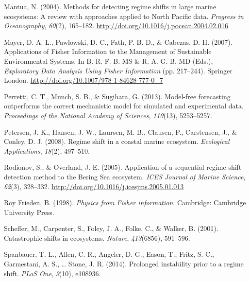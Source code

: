 \documentclass[12pt,twoside]{reedthesis}
\begin{document}
\hypertarget{ref-mantua_methods_2004}{}
Mantua, N. (2004). Methods for detecting regime shifts in large marine
ecosystems: A review with approaches applied to North Pacific data.
\emph{Progress in Oceanography}, \emph{60}(2), 165--182.
\url{http://doi.org/10.1016/j.pocean.2004.02.016}

\hypertarget{ref-mayer_applications_2007}{}
Mayer, D. A. L., Pawlowski, D. C., Fath, P. B. D., \& Cabezas, D. H.
(2007). Applications of Fisher Information to the Management of
Sustainable Environmental Systems. In B. R. F. B. MS \& R. A. G. B. MD
(Eds.), \emph{Exploratory Data Analysis Using Fisher Information} (pp.
217--244). Springer London.
\url{http://doi.org/10.1007/978-1-84628-777-0_7}

\hypertarget{ref-perretti_model-free_2013}{}
Perretti, C. T., Munch, S. B., \& Sugihara, G. (2013). Model-free
forecasting outperforms the correct mechanistic model for simulated and
experimental data. \emph{Proceedings of the National Academy of
Sciences}, \emph{110}(13), 5253--5257.

\hypertarget{ref-petersen2008regime}{}
Petersen, J. K., Hansen, J. W., Laursen, M. B., Clausen, P., Carstensen,
J., \& Conley, D. J. (2008). Regime shift in a coastal marine ecosystem.
\emph{Ecological Applications}, \emph{18}(2), 497--510.

\hypertarget{ref-rodionov_application_2005}{}
Rodionov, S., \& Overland, J. E. (2005). Application of a sequential
regime shift detection method to the Bering Sea ecosystem. \emph{ICES
Journal of Marine Science}, \emph{62}(3), 328--332.
\url{http://doi.org/10.1016/j.icesjms.2005.01.013}

\hypertarget{ref-roy_frieden_physics_1998}{}
Roy Frieden, B. (1998). \emph{Physics from Fisher information}.
Cambridge: Cambridge University Press.

\hypertarget{ref-scheffer_catastrophic_2001}{}
Scheffer, M., Carpenter, S., Foley, J. A., Folke, C., \& Walker, B.
(2001). Catastrophic shifts in ecosystems. \emph{Nature},
\emph{413}(6856), 591--596.

\hypertarget{ref-spanbauer_prolonged_2014}{}
Spanbauer, T. L., Allen, C. R., Angeler, D. G., Eason, T., Fritz, S. C.,
Garmestani, A. S., \ldots{} Stone, J. R. (2014). Prolonged instability
prior to a regime shift. \emph{PLoS One}, \emph{9}(10), e108936.


\end{document}
